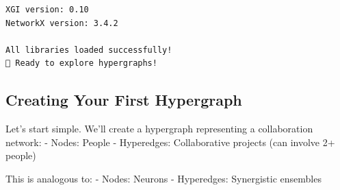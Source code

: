 \documentclass[
  11pt,
  letterpaper,
  oneside,
  openany]{book}
\begin{document}
\begin{verbatim}
XGI version: 0.10
NetworkX version: 3.4.2

All libraries loaded successfully!
🎉 Ready to explore hypergraphs!
\end{verbatim}

\subsection{Creating Your First
Hypergraph}\label{creating-your-first-hypergraph}

Let's start simple. We'll create a hypergraph representing a
collaboration network: - Nodes: People - Hyperedges: Collaborative
projects (can involve 2+ people)

This is analogous to: - Nodes: Neurons - Hyperedges: Synergistic
ensembles
\end{document}
